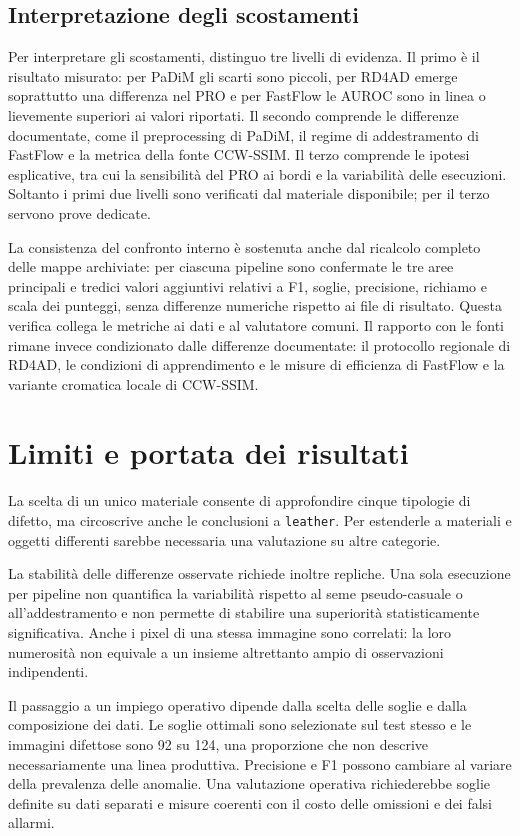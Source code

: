 \subsection{Interpretazione degli scostamenti}

Per interpretare gli scostamenti, distinguo tre livelli di evidenza. Il primo è il risultato misurato: per PaDiM gli scarti sono piccoli, per RD4AD emerge soprattutto una differenza nel PRO e per FastFlow le AUROC sono in linea o lievemente superiori ai valori riportati. Il secondo comprende le differenze documentate, come il preprocessing di PaDiM, il regime di addestramento di FastFlow e la metrica della fonte CCW-SSIM. Il terzo comprende le ipotesi esplicative, tra cui la sensibilità del PRO ai bordi e la variabilità delle esecuzioni. Soltanto i primi due livelli sono verificati dal materiale disponibile; per il terzo servono prove dedicate.

La consistenza del confronto interno è sostenuta anche dal ricalcolo completo delle mappe archiviate: per ciascuna pipeline sono confermate le tre aree principali e tredici valori aggiuntivi relativi a F1, soglie, precisione, richiamo e scala dei punteggi, senza differenze numeriche rispetto ai file di risultato. Questa verifica collega le metriche ai dati e al valutatore comuni. Il rapporto con le fonti rimane invece condizionato dalle differenze documentate: il protocollo regionale di RD4AD, le condizioni di apprendimento e le misure di efficienza di FastFlow e la variante cromatica locale di CCW-SSIM.

\section{Limiti e portata dei risultati}
\label{sec:cap4-limiti}

La scelta di un unico materiale consente di approfondire cinque tipologie di difetto, ma circoscrive anche le conclusioni a \texttt{leather}. Per estenderle a materiali e oggetti differenti sarebbe necessaria una valutazione su altre categorie.

La stabilità delle differenze osservate richiede inoltre repliche. Una sola esecuzione per pipeline non quantifica la variabilità rispetto al seme pseudo-casuale o all'addestramento e non permette di stabilire una superiorità statisticamente significativa. Anche i pixel di una stessa immagine sono correlati: la loro numerosità non equivale a un insieme altrettanto ampio di osservazioni indipendenti.

Il passaggio a un impiego operativo dipende dalla scelta delle soglie e dalla composizione dei dati. Le soglie ottimali sono selezionate sul test stesso e le immagini difettose sono 92 su 124, una proporzione che non descrive necessariamente una linea produttiva. Precisione e F1 possono cambiare al variare della prevalenza delle anomalie. Una valutazione operativa richiederebbe soglie definite su dati separati e misure coerenti con il costo delle omissioni e dei falsi allarmi.

